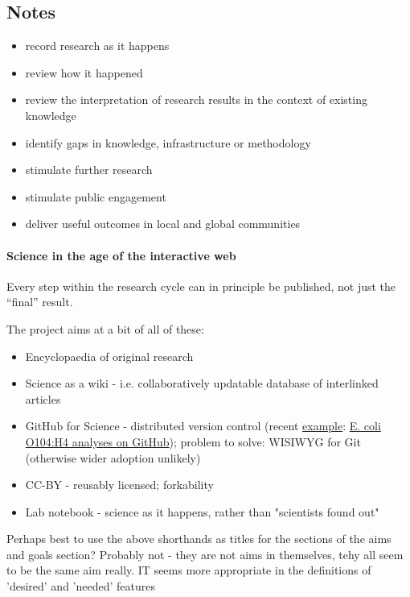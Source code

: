 \documentclass[final,authoryear,3p]{elsarticle-open-drafting}
\begin{document}
\subsection{Notes}

\begin{itemize}
	\item record research as it happens
	\item review how it happened
	\item review the interpretation of research results in the context of existing knowledge
	\item identify gaps in knowledge, infrastructure or methodology
	\item stimulate further research
	\item stimulate public engagement
	\item deliver useful outcomes in local and global communities
\end{itemize}

\paragraph{Science in the age of the interactive web}

Every step within the research cycle can in principle be published, not just the ``final'' result.

The project aims at a bit of all of these:
\begin{itemize}
	\item Encyclopaedia of original research
	\item Science as a wiki - i.e. collaboratively updatable database of interlinked articles
	\item GitHub for Science - distributed version control (recent \href{http://bacpathgenomics.wordpress.com/2011/06/13/e-coli-data-released-under-creative-commons-0-license/}{example}: \href{https://github.com/ehec-outbreak-crowdsourced/BGI-data-analysis/wiki}{E. coli O104:H4 analyses on GitHub}); problem to solve: WISIWYG for Git (otherwise wider adoption unlikely)
	\item CC-BY - reusably licensed; forkability
	\item Lab notebook - science as it happens, rather than "scientists found out"
\end{itemize}

Perhaps best to use the above shorthands as titles for the sections of the aims and goals section?
Probably not - they are not aims in themselves, tehy all seem to be the same aim really. IT seems more appropriate in the definitions of 'desired' and 'needed' features
\end{document}

